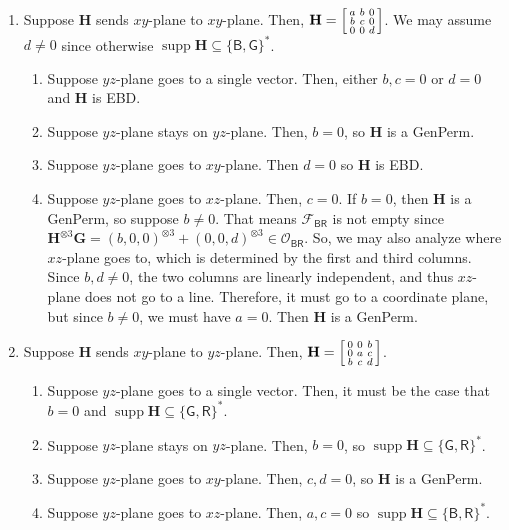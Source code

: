 \documentclass[11pt]{article}
\DeclareMathOperator{\supp}{supp}
\newcommand{\db}{\mathsf{B}}
\newcommand{\dg}{\mathsf{G}}
\newcommand{\dr}{\mathsf{R}}
\newcommand{\genperm}{\textsf{GenPerm}\xspace}
\newcommand{\teh}{^{\otimes 3}}
\newcommand{\strspt}{\textsf{EBD}\xspace}
\begin{document}
\begin{enumerate}
\item
Suppose $\mathbf{H}$ sends $xy$-plane to $xy$-plane.
Then, $\mathbf{H} = \begin{bsmallmatrix}
  a & b & 0 \\
  b & c & 0 \\
  0 & 0 & d
\end{bsmallmatrix}$.
We may assume $d \ne 0$ since otherwise $\supp \mathbf{H} \subseteq \{\db, \dg\}^*$.
\begin{enumerate}
\item Suppose $yz$-plane goes to a single vector.
    Then, either $b, c = 0$ or $d = 0$ and $\mathbf{H}$ is \strspt.
  \item Suppose $yz$-plane stays on $yz$-plane.
    Then, $b = 0$, so $\mathbf{H}$ is a \genperm.
  \item Suppose $yz$-plane goes to $xy$-plane.
    Then $d = 0$ so $\mathbf{H}$ is \strspt.
  \item Suppose $yz$-plane goes to $xz$-plane.
    Then, $c = 0$.
    If $b = 0$, then $\mathbf{H}$ is a \genperm, so suppose $b \ne 0$.
    That means $\mathcal{F}_{\db \dr}$ is not empty since $\mathbf{H}\teh \mathbf{G} = (b, 0, 0)\teh + (0, 0, d)\teh \in \mathcal{O}_{\db \dr}$.
    So, we may also analyze where $xz$-plane goes to, which is determined by the first and third columns.
    Since $b, d \ne 0$, the two columns are linearly independent, and thus $xz$-plane does not go to a line.
    Therefore, it must go to a coordinate plane, but since $b \ne 0$, we must have $a = 0$. Then $\mathbf{H}$ is a \genperm.
\end{enumerate}

\item
Suppose $\mathbf{H}$ sends $xy$-plane to $yz$-plane.
Then, $\mathbf{H} = \begin{bsmallmatrix}
  0 & 0 & b \\
  0 & a & c \\
  b & c & d
\end{bsmallmatrix}$.
\begin{enumerate}
\item Suppose $yz$-plane goes to a single vector.
    Then, it must be the case that $b = 0$ and $\supp \mathbf{H} \subseteq \{\dg, \dr\}^*$.
  \item Suppose $yz$-plane stays on $yz$-plane.
    Then, $b = 0$, so $\supp \mathbf{H} \subseteq \{\dg, \dr\}^*$.
  \item Suppose $yz$-plane goes to $xy$-plane.
    Then, $c, d = 0$, so $\mathbf{H}$ is a \genperm.
  \item Suppose $yz$-plane goes to $xz$-plane.
    Then, $a, c = 0$ so $\supp \mathbf{H} \subseteq \{\db, \dr\}^*$.
\end{enumerate}


\end{enumerate}
\end{document}
